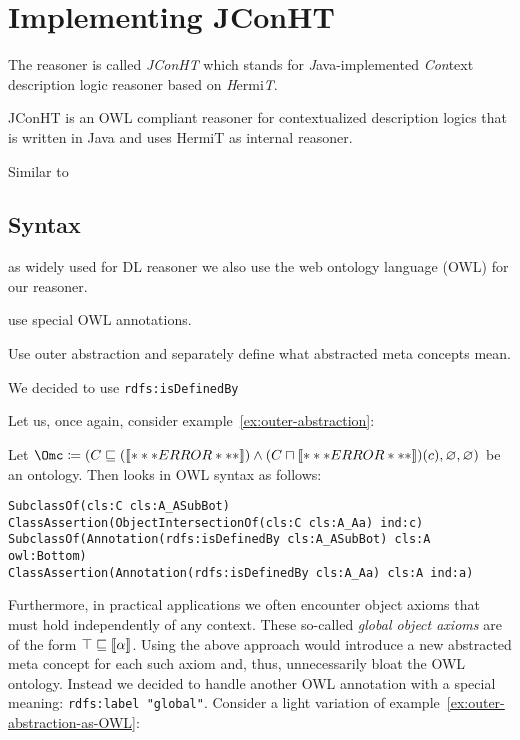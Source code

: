 \section{Implementing JConHT}
\label{sec:implementing-jconht}

The reasoner is called \emph{JConHT} which stands for \emph{J}ava-implemented \emph{Con}text
description logic reasoner based on \emph{H}ermi\emph{T}.

JConHT is an OWL compliant reasoner for contextualized description logics that is written in Java
and uses HermiT as internal reasoner.

Similar to

\clearpage

\subsection{Syntax}
\label{sec:syntax}


as widely used for DL reasoner we also use the web ontology language (OWL) for our reasoner. 

use special OWL annotations.

Use outer abstraction and separately define what abstracted meta concepts mean.


We decided to use \verb+rdfs:isDefinedBy+

Let us, once again, consider example~\ref{ex:outer-abstraction}:
\begin{example}\label{ex:outer-abstraction-as-OWL}
  Let
  $\Omc \coloneqq (C\sqsubseteq(\oax{A\sqsubseteq\bot}) \land (C\sqcap\oax{A(a)})(c), \emptyset,
  \emptyset)$ be an \ALCALC ontology. Then \Omc looks in OWL syntax as follows:

\begin{verbatim}
SubclassOf(cls:C cls:A_ASubBot)
ClassAssertion(ObjectIntersectionOf(cls:C cls:A_Aa) ind:c)
SubclassOf(Annotation(rdfs:isDefinedBy cls:A_ASubBot) cls:A owl:Bottom)
ClassAssertion(Annotation(rdfs:isDefinedBy cls:A_Aa) cls:A ind:a)
\end{verbatim}

\vspace{-2.0\baselineskip}  
\end{example}

Furthermore, in practical applications we often encounter object axioms that must hold independently
of any context. These so-called \emph{global object axioms} are of the form
$\top \sqsubseteq \llbracket\alpha\rrbracket$. Using the above approach would introduce a new abstracted  meta concept for each such axiom and, thus, unnecessarily bloat the OWL
ontology. Instead we decided to handle another OWL annotation with a special meaning:
\verb+rdfs:label "global"+. Consider a light variation of example~\ref{ex:outer-abstraction-as-OWL}:

